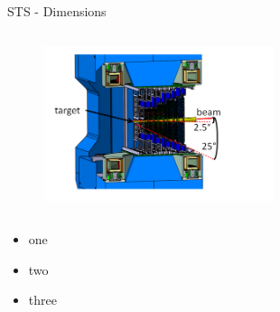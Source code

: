 \begin{columnframe}{STS - Dimensions}
    \begin{column}{0.5\textwidth}
        \begin{figure}
            \centering
            \includegraphics[width=0.6\textwidth, frame]{images/sts_dimensions.png}
        \end{figure}
    \end{column}
    \begin{column}{0.5\textwidth}
        \begin{itemize}
            \item one
            \item two
            \item three
        \end{itemize}
    \end{column}
\end{columnframe}
